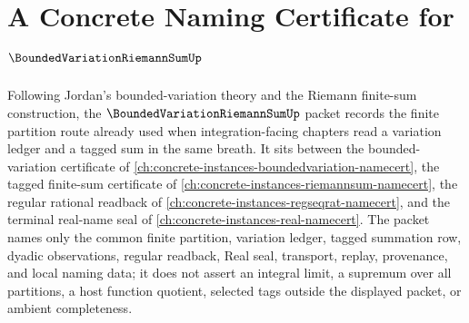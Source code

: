 \chapter{A Concrete Naming Certificate for $\BoundedVariationRiemannSumUp$}
\label{ch:concrete-instances-bounded-variation-riemann-sum-namecert}

Following Jordan's bounded-variation theory and the Riemann finite-sum construction, the $\BoundedVariationRiemannSumUp$ packet records the finite partition route already used when integration-facing chapters read a variation ledger and a tagged sum in the same breath. It sits between the bounded-variation certificate of \autoref{ch:concrete-instances-boundedvariation-namecert}, the tagged finite-sum certificate of \autoref{ch:concrete-instances-riemannsum-namecert}, the regular rational readback of \autoref{ch:concrete-instances-regseqrat-namecert}, and the terminal real-name seal of \autoref{ch:concrete-instances-real-namecert}. The packet names only the common finite partition, variation ledger, tagged summation row, dyadic observations, regular readback, Real seal, transport, replay, provenance, and local naming data; it does not assert an integral limit, a supremum over all partitions, a host function quotient, selected tags outside the displayed packet, or ambient completeness.

